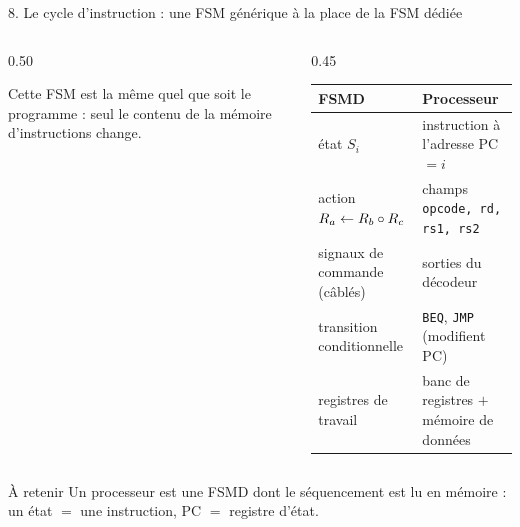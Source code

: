 \begin{frame}{8. Le cycle d'instruction : une FSM générique à la place de la FSM dédiée}
\begin{columns}[T]
  \begin{column}{0.50\textwidth}
  \centering

  \vspace{1mm}
  \footnotesize
  Cette FSM est \alert{la même quel que soit le programme} : seul le contenu de la mémoire d'instructions change.
  \end{column}

  \begin{column}{0.45\textwidth}
    \scriptsize
    \renewcommand{\arraystretch}{1.2}
    \setlength{\tabcolsep}{3pt}
    \begin{tabular}{|p{2.5cm}|p{3.2cm}|}
    \hline
    \textbf{FSMD} & \textbf{Processeur} \\ \hline
    état $S_i$ & instruction à l'adresse PC $=i$ \\ \hline
    action $R_a \leftarrow R_b \circ R_c$ & champs \texttt{opcode, rd, rs1, rs2} \\ \hline
    signaux de commande (câblés) & sorties du décodeur \\ \hline
    transition conditionnelle & \texttt{BEQ}, \texttt{JMP} (modifient PC) \\ \hline
    registres de travail & banc de registres $+$ mémoire de données \\ \hline
    \end{tabular}
    \end{column}
\end{columns}

\vspace{2mm}
\begin{block}{À retenir}
\footnotesize
Un processeur est une FSMD dont le \alert{séquencement est lu} en mémoire : \alert{un état $=$ une instruction}, \alert{PC $=$ registre d'état}.
\end{block}
\end{frame}

